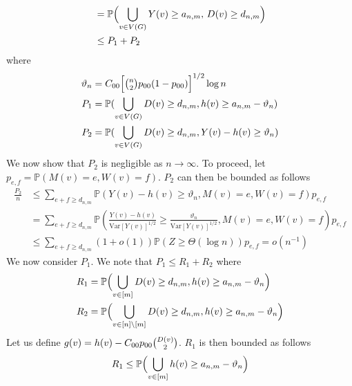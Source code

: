 \documentclass[final]{IEEEtran}
\theoremstyle{definition}
\begin{document}
\begin{IEEEproof}
\begin{IEEEproof}[Eq.~\eqref{eq:27}]
\begin{equation*}
\begin{split}
    &= \mathbb{P}\Bigl( \bigcup_{v
      \in V(G)} Y(v) \geq a_{n,m}, \, D(v) \geq d_{n,m} \Bigr) \\
    &\leq P_1 + P_2
    \end{split}
  \end{equation*}
  where 
  \begin{align*}
    \vartheta_n &= C_{00} \Bigl[ \tbinom{n}{2} p_{00} (1 -
    p_{00})\Bigr]^{1/2} \log{n} \\
    P_1 &= \mathbb{P}(\bigcup_{v \in V(G)} D(v) \geq d_{n,m}, h(v) \geq
    a_{n,m} - \vartheta_n) \\
    P_2 &= \mathbb{P}(\bigcup_{v \in V(G)} D(v) \geq d_{n,m},
    Y(v) - h(v) \geq \vartheta_n)
  \end{align*}
  We now show that $P_2$ is negligible as $n \rightarrow \infty$. To
  proceed, let $p_{e,f} = \mathbb{P}(M(v) = e, W(v) =
f)$. $P_2$ can then be bounded as follows
\begin{equation*}
  \begin{split}
    \frac{P_2}{n} & \leq \sum_{e + f \geq
        d_{n,m}}{\mathbb{P}( Y(v) - h(v) \geq
      \vartheta_{n}, M(v) = e, W(v) = f) p_{e,f}}
  \\
  &=  \sum_{e + f \geq d_{n,m}}{\mathbb{P}(
    \tfrac{Y(v) - h(v)}{\mathrm{Var}[Y(v)]^{1/2}} \geq
    \tfrac{\vartheta_n}{\mathrm{Var}[Y(v)]^{1/2}}, M(v) = e, W(v) = f) p_{e,f}} \\
    &\leq \sum_{e + f \geq d_{n,m}} (1 + o(1))
    \mathbb{P}(Z \geq \Theta(\log{n})) p_{e,f} = o(n^{-1})
  \end{split}
\end{equation*}
We now consider $P_1$. We note that $P_1 \leq R_1 + R_2$
where
\begin{align*}
  R_1 &= \mathbb{P}\Bigl(\bigcup_{v \in [m]} D(v) \geq
  d_{n,m}, h(v) \geq a_{n,m} - \vartheta_n \Bigr) \\  
  R_2 &= \mathbb{P}\Bigl(\bigcup_{v \in [n] \setminus [m]} D(v) \geq
  d_{n,m}, h(v) \geq a_{n,m} - \vartheta_n \Bigr)
\end{align*}
Let us define $g(v) = h(v) - C_{00}p_{00} \tbinom{D(v)}{2}$.
$R_1$ is then bounded as follows
\begin{equation}
  \begin{split}
    \label{eq:36}
    R_1 &\leq \mathbb{P}\Bigl( \bigcup_{v \in [m]} h(v) \geq
    a_{n,m} - \vartheta_{n} \Bigr) \\

\end{split}
\end{equation}
\end{IEEEproof}
\end{IEEEproof}
\end{document}

